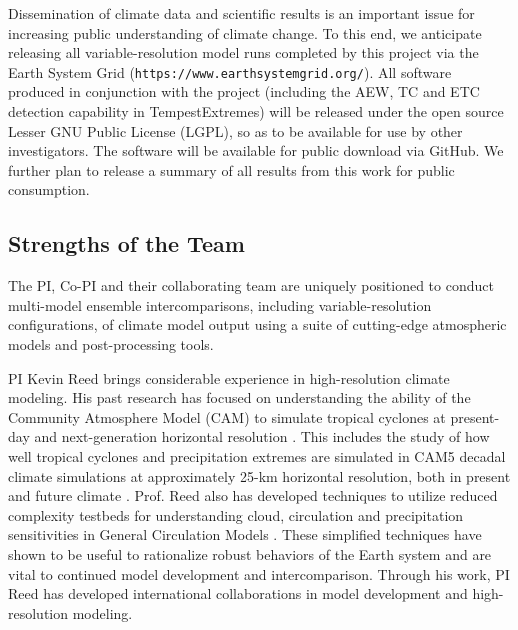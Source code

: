 \documentclass[11pt]{article}
\begin{document}
Dissemination of climate data and scientific results is an important issue for increasing public understanding of climate change.  To this end, we anticipate releasing all variable-resolution model runs completed by this project via the Earth System Grid (\texttt{https://www.earthsystemgrid.org/}).  All software produced in conjunction with the project (including the AEW, TC and ETC detection capability in TempestExtremes) will be released under the open source Lesser GNU Public License (LGPL), so as to be available for use by other investigators.  The software will be available for public download via GitHub.  We further plan to release a summary of all results from this work for public consumption.

\subsection{Strengths of the Team}\label{sec:strengths}

The PI, Co-PI and their collaborating team are uniquely positioned to conduct multi-model ensemble intercomparisons, including variable-resolution configurations, of climate model output using a suite of cutting-edge atmospheric models and post-processing tools.

PI Kevin Reed brings considerable experience in high-resolution climate modeling.  His past research has focused on understanding the ability of the Community Atmosphere Model (CAM) to simulate tropical cyclones at present-day and next-generation horizontal resolution \citep{Reed2011a,Reed2011c,Reed2012b}.  This includes the study of how well tropical cyclones and precipitation extremes are simulated in CAM5 decadal climate simulations at approximately 25-km horizontal resolution, both in present and future climate \citep{Wehner2014,Villarini2014,Wehner2015,Reed2015b}. Prof. Reed also has developed techniques to utilize reduced complexity testbeds for understanding cloud, circulation and precipitation sensitivities in General Circulation Models  \citep{Reed2012a,Reed2015a}. These simplified techniques have shown to be useful to rationalize robust behaviors of the Earth system and are vital to continued model development and intercomparison. Through his work, PI Reed has developed international collaborations in model development and high-resolution modeling.
\end{document}
